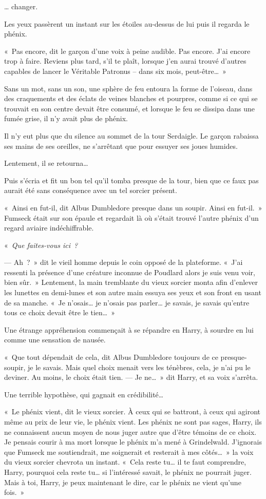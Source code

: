 … changer.

Les yeux passèrent un instant sur les étoiles au-dessus de lui puis il regarda le phénix.

«~Pas encore, dit le garçon d'une voix à peine audible.
Pas encore.
J'ai encore trop à faire.
Reviens plus tard, s'il te plaît, lorsque j'en aurai trouvé d'autres capables de lancer le Véritable Patronus -- dans six mois, peut-être…~»

Sans un mot, sans un son, une sphère de feu entoura la forme de l'oiseau, dans des craquements et des éclats de veines blanches et pourpres, comme si ce qui se trouvait en son centre devait être consumé, et lorsque le feu se dissipa dans une fumée grise, il n'y avait plus de phénix.

Il n'y eut plus que du silence au sommet de la tour Serdaigle.
Le garçon rabaissa ses mains de ses oreilles, ne s'arrêtant que pour essuyer ses joues humides.

Lentement, il se retourna…

Puis s'écria et fit un bon tel qu'il tomba presque de la tour, bien que ce faux pas aurait été sans conséquence avec un tel sorcier présent.

«~Ainsi en fut-il, dit Albus Dumbledore presque dans un soupir.
Ainsi en fut-il.~»
Fumseck était sur son épaule et regardait là où s'était trouvé l'autre phénix d'un regard aviaire indéchiffrable.

«~\emph{Que faites-vous ici~? }

---  Ah~?~»
dit le vieil homme depuis le coin opposé de la plateforme.
«~J'ai ressenti la présence d'une créature inconnue de Poudlard alors je suis venu voir, bien sûr.~»
Lentement, la main tremblante du vieux sorcier monta afin d'enlever les lunettes en demi-lunes et son autre main essuya ses yeux et son front en usant de sa manche.
«~Je n'osais… je n'osais pas parler… je savais, je savais qu'entre tous ce choix devait être le tien…~»

Une étrange appréhension commençait à se répandre en Harry, à sourdre en lui comme une sensation de nausée.

«~Que tout dépendait de cela, dit Albus Dumbledore toujours de ce presque-soupir, je le savais.
Mais quel choix menait vers les ténèbres, cela, je n'ai pu le deviner.
Au moins, le choix était tien.
---  Je ne…~»
dit Harry, et sa voix s'arrêta.

Une terrible hypothèse, qui gagnait en crédibilité…

«~Le phénix vient, dit le vieux sorcier.
À ceux qui se battront, à ceux qui agiront même au prix de leur vie, le phénix vient.
Les phénix ne sont pas sages, Harry, ils ne connaissent aucun moyen de nous juger autre que d'être témoins de ce choix.
Je pensais courir à ma mort lorsque le phénix m'a mené à Grindelwald.
J'ignorais que Fumseck me soutiendrait, me soignerait et resterait à mes côtés…~»
la voix du vieux sorcier chevrota un instant.
«~Cela reste tu… il te faut comprendre, Harry, pourquoi cela reste tu… si l'intéressé savait, le phénix ne pourrait juger.
Mais à toi, Harry, je peux maintenant le dire, car le phénix ne vient qu'une fois.~»

